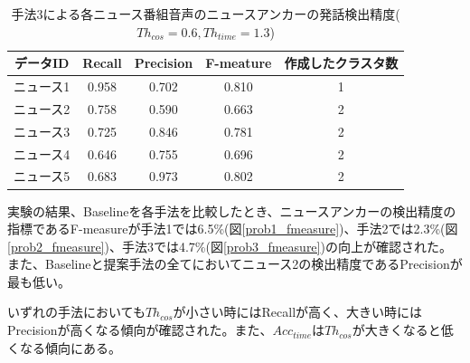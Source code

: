 \begin{table}[H]
  \begin{center}
    \caption{手法3による各ニュース番組音声のニュースアンカーの発話検出精度($Th_{cos}=0.6,Th_{time}=1.3$) \label{table:prob3_eachnews}}
    \begin{tabular}{|c||c|c|c|c|} \hline
データID & Recall & Precision & F-meature & 作成したクラスタ数\\ \hline
ニュース1 & 0.958 & 0.702 & 0.810 & 1 \\ \hline
ニュース2 & 0.758 & 0.590 & 0.663 & 2 \\ \hline
ニュース3 & 0.725 & 0.846 & 0.781 & 2 \\ \hline
ニュース4 & 0.646 & 0.755 & 0.696 & 2 \\ \hline
ニュース5 & 0.683 & 0.973 & 0.802 & 2 \\ \hline
    \end{tabular}
  \end{center}
\end{table}

実験の結果、Baselineを各手法を比較したとき、ニュースアンカーの検出精度の指標であるF-measureが手法1では6.5\%(図\ref{prob1_fmeasure})、手法2では2.3\%(図\ref{prob2_fmeasure})、手法3では4.7\%(図\ref{prob3_fmeasure})の向上が確認された。また、Baselineと提案手法の全てにおいてニュース2の検出精度であるPrecisionが最も低い。\par
いずれの手法においても$Th_{cos}$が小さい時にはRecallが高く、大きい時にはPrecisionが高くなる傾向が確認された。また、$Acc_{time}$は$Th_{cos}$が大きくなると低くなる傾向にある。\par

